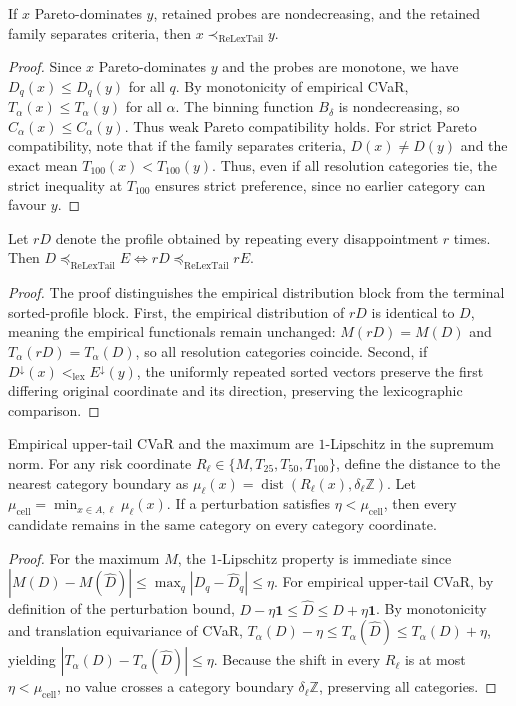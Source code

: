 \begin{theorem}
If $x$ Pareto-dominates $y$, retained probes are nondecreasing, and the retained family separates criteria, then $x \prec_{\mathrm{ReLexTail}} y$.
\end{theorem}
\begin{proof}
Since $x$ Pareto-dominates $y$ and the probes are monotone, we have $D_q(x) \leq D_q(y)$ for all $q$.
By monotonicity of empirical CVaR, $T_\alpha(x) \leq T_\alpha(y)$ for all $\alpha$. The binning function $B_\delta$ is nondecreasing, so $C_\alpha(x) \leq C_\alpha(y)$. Thus weak Pareto compatibility holds. For strict Pareto compatibility, note that if the family separates criteria, $D(x) \neq D(y)$ and the exact mean $T_{100}(x) < T_{100}(y)$. Thus, even if all resolution categories tie, the strict inequality at $T_{100}$ ensures strict preference, since no earlier category can favour $y$.
\end{proof}

\begin{theorem}
Let $rD$ denote the profile obtained by repeating every disappointment $r$ times. Then $D \preceq_{\mathrm{ReLexTail}} E \iff rD \preceq_{\mathrm{ReLexTail}} rE$.
\end{theorem}
\begin{proof}
The proof distinguishes the empirical distribution block from the terminal sorted-profile block. First, the empirical distribution of $rD$ is identical to $D$, meaning the empirical functionals remain unchanged: $M(rD) = M(D)$ and $T_\alpha(rD) = T_\alpha(D)$, so all resolution categories coincide. Second, if $D^\downarrow(x) <_{\mathrm{lex}} E^\downarrow(y)$, the uniformly repeated sorted vectors preserve the first differing original coordinate and its direction, preserving the lexicographic comparison.
\end{proof}

\begin{theorem}
Empirical upper-tail CVaR and the maximum are $1$-Lipschitz in the supremum norm. 
For any risk coordinate $R_\ell \in \{M, T_{25}, T_{50}, T_{100}\}$, define the distance to the nearest category boundary as $\mu_\ell(x) = \operatorname{dist}(R_\ell(x), \delta_\ell \mathbb{Z})$. Let $\mu_{\mathrm{cell}} = \min_{x\in A, \ell} \mu_\ell(x)$. If a perturbation satisfies $\eta < \mu_{\mathrm{cell}}$, then every candidate remains in the same category on every category coordinate.
\end{theorem}
\begin{proof}
For the maximum $M$, the $1$-Lipschitz property is immediate since $|M(D) - M(\widehat{D})| \leq \max_q |D_q - \widehat{D}_q| \leq \eta$. For empirical upper-tail CVaR, by definition of the perturbation bound, $D - \eta\mathbf{1} \leq \widehat{D} \leq D + \eta\mathbf{1}$. By monotonicity and translation equivariance of CVaR, $T_\alpha(D) - \eta \leq T_\alpha(\widehat{D}) \leq T_\alpha(D) + \eta$, yielding $|T_\alpha(D) - T_\alpha(\widehat{D})| \leq \eta$. Because the shift in every $R_\ell$ is at most $\eta < \mu_{\mathrm{cell}}$, no value crosses a category boundary $\delta_\ell \mathbb{Z}$, preserving all categories.
\end{proof}

